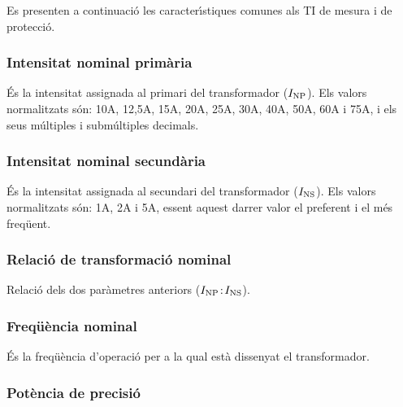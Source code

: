 Es presenten a continuaci\'{o} les caracter\'{\i}stiques comunes als TI de
mesura i de protecci\'{o}.

\subsubsection{Intensitat nominal prim\`{a}ria}

 \'{E}s la intensitat assignada al
primari del transformador ($I_\mathrm{NP}$). Els valors normalitzats
s\'{o}n: 10\unit{A}, 12,5\unit{A}, 15\unit{A}, 20\unit{A}, 25\unit{A},
30\unit{A}, 40\unit{A}, 50\unit{A}, 60\unit{A} i 75\unit{A}, i els
seus m\'{u}ltiples i subm\'{u}ltiples decimals.

\subsubsection{Intensitat nominal secund\`{a}ria}

 \'{E}s la intensitat assignada al
secundari del transformador ($I_\mathrm{NS}$). Els valors normalitzats
s\'{o}n: 1\unit{A}, 2\unit{A} i 5\unit{A}, essent aquest darrer valor el
preferent i el m\'{e}s freq\"{u}ent.

\subsubsection{Relaci\'{o} de transformaci\'{o} nominal}

Relaci\'{o} dels dos  par\`{a}metres anteriors ($I_\mathrm{NP}\!:\!I_\mathrm{NS}$).

\subsubsection{Freq\"{u}\`{e}ncia nominal}

 \'{E}s la freq\"{u}\`{e}ncia d'operaci\'{o} per a la qual    est\`{a} dissenyat el transformador.

\subsubsection{Pot\`{e}ncia de precisi\'{o}}

